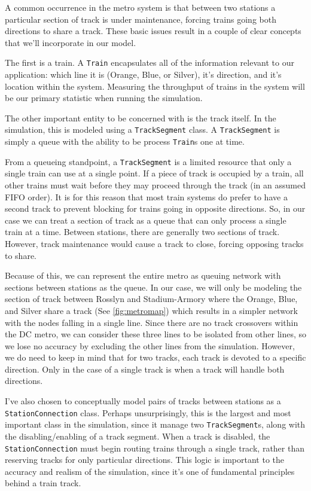 \documentclass[a4paper,12pt]{article}
\begin{document}
A common occurrence in the metro system is that between two stations a particular section of track is under
maintenance, forcing trains going both directions to share a track. These basic issues result in a couple of clear
concepts that we'll incorporate in our model.

The first is a train. A \texttt{Train} encapsulates all of the information relevant to our application: which line it is
(Orange, Blue, or Silver), it's direction, and it's location within the system. Measuring the throughput of trains
in the system will be our primary statistic when running the simulation.

The other important entity to be concerned with is the track itself. In the simulation, this is modeled using a
\texttt{TrackSegment} class. A \texttt{TrackSegment} is simply a queue with the ability to be process \texttt{Train}s
one at time.

From a queueing standpoint, a \texttt{TrackSegment} is a limited
resource that only a single train can use at a single point. If a piece of track is occupied by a train, all other
trains must wait before they may proceed through the track (in an assumed FIFO order). It is for this reason that
most train systems do prefer to have a second track to prevent blocking for trains going in opposite directions.
So, in our case we can treat a section of track as a queue that can only process a single train at a time. Between
stations, there are generally two sections of track. However, track maintenance would cause a track to close, forcing
opposing tracks to share.

Because of this, we can represent the entire metro as queuing network with sections between stations as the queue. In
our case, we will only be modeling the section of track between Rosslyn and Stadium-Armory where the Orange, Blue, and
Silver share a track (See \ref{fig:metromap}) which results in a simpler network with the nodes falling in a single
line. Since there are no track crossovers within the DC metro, we can consider these three lines
to be isolated from other lines, so we lose no accuracy by excluding the other lines from the simulation. However, we
do need to keep in mind that for two tracks, each track is devoted to a specific direction. Only in the case of a single
track is when a track will handle both directions.

I've also chosen to conceptually model pairs of tracks between stations as a \texttt{StationConnection} class. Perhaps
unsurprisingly, this is the largest and most important class in the simulation, since it manage two
\texttt{TrackSegment}s, along with the disabling/enabling of a track segment. When a track is disabled, the
\texttt{StationConnection} must begin routing trains through a single track, rather than reserving tracks for
only particular directions. This logic is important to the accuracy and realism of the simulation, since it's one of
fundamental principles behind a train track. 
\end{document}
